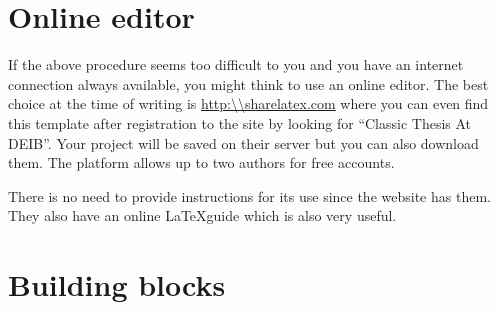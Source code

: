 \section{Online editor}
If the above procedure seems too difficult to you and you have an internet connection always available, you might think to use an online editor. The best choice at the time of writing is \url{http:\\sharelatex.com} where you can even find this template after registration to the site by looking for \enquote{Classic Thesis At DEIB}. Your project will be saved on their server but you can also download them. The platform allows up to two authors for free accounts.

There is no need to provide instructions for its use since the website has them. They also have an online \LaTeX guide which is also very useful.

\section{Building blocks}

